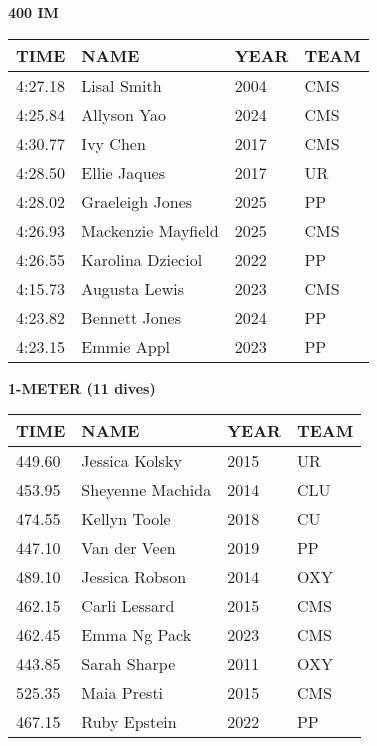 \vspace{0.4cm}

\begin{center}
\begin{minipage}[t]{0.7\textwidth}
\centering
\textbf{400 IM}\\[0.05cm]
\begin{tabular}{@{}p{1.8cm}p{2.8cm}p{1.2cm}p{1.4cm}@{}}
\hline
\textbf{TIME} & \textbf{NAME} & \textbf{YEAR} & \textbf{TEAM} \\
\hline
4:27.18 & Lisal Smith & 2004 & CMS \\
4:25.84 & Allyson Yao & 2024 & CMS \\
4:30.77 & Ivy Chen & 2017 & CMS \\
4:28.50 & Ellie Jaques & 2017 & UR \\
4:28.02 & Graeleigh Jones & 2025 & PP \\
4:26.93 & Mackenzie Mayfield & 2025 & CMS \\
4:26.55 & Karolina Dzieciol & 2022 & PP \\
4:15.73 & Augusta Lewis & 2023 & CMS \\
4:23.82 & Bennett Jones & 2024 & PP \\
4:23.15 & Emmie Appl & 2023 & PP \\
\hline
\end{tabular}
\end{minipage}
\end{center}

\vspace{0.4cm}

\begin{center}
\begin{minipage}[t]{0.7\textwidth}
\centering
\textbf{1-METER (11 dives)}\\[0.05cm]
\begin{tabular}{@{}p{1.8cm}p{2.8cm}p{1.2cm}p{1.4cm}@{}}
\hline
\textbf{TIME} & \textbf{NAME} & \textbf{YEAR} & \textbf{TEAM} \\
\hline
449.60 & Jessica Kolsky & 2015 & UR \\
453.95 & Sheyenne Machida & 2014 & CLU \\
474.55 & Kellyn Toole & 2018 & CU \\
447.10 & Van der Veen & 2019 & PP \\
489.10 & Jessica Robson & 2014 & OXY \\
462.15 & Carli Lessard & 2015 & CMS \\
462.45 & Emma Ng Pack & 2023 & CMS \\
443.85 & Sarah Sharpe & 2011 & OXY \\
525.35 & Maia Presti & 2015 & CMS \\
467.15 & Ruby Epstein & 2022 & PP \\
\hline
\end{tabular}
\end{minipage}
\end{center}

